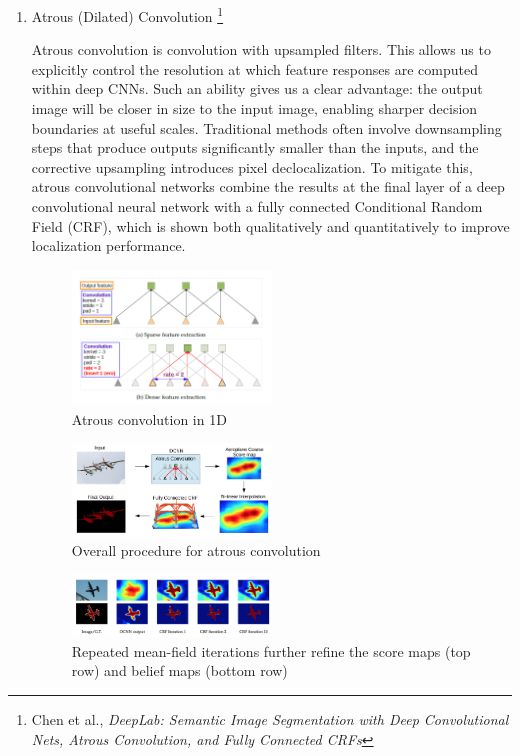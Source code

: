 \documentclass{article}
\begin{document}
\begin{enumerate}
\item Atrous (Dilated) Convolution \footnote{Chen et al., \textit{DeepLab: Semantic Image Segmentation with Deep Convolutional Nets, Atrous Convolution,
and Fully Connected CRFs}}

Atrous convolution is convolution with upsampled filters. This allows us to explicitly control the resolution at which feature responses are computed within deep CNNs. Such an ability gives us a clear advantage: the output image will be closer in size to the input image, enabling sharper decision boundaries at useful scales. Traditional methods often involve downsampling steps that produce outputs significantly smaller than the inputs, and the corrective upsampling introduces pixel declocalization. To mitigate this, atrous convolutional networks combine the results at the final layer of a deep convolutional neural network with a fully connected Conditional Random Field (CRF), which is shown both qualitatively and quantitatively to improve localization performance. 

\begin{figure}[h]
    \centering
    \includegraphics[width=0.5\textwidth]{21/deeplab.png}
    \caption{Atrous convolution in 1D}
    \label{fig:atrous}
\end{figure}


\begin{figure}[h]
    \centering
    \includegraphics[width=0.5\textwidth]{21/atrous_overview.png}
    \caption{Overall procedure for atrous convolution}
    \label{fig:atrous_sketch}
\end{figure}



\begin{figure}[h]
    \centering
    \includegraphics[width=0.5\textwidth]{21/crf_iter.png}
    \caption{Repeated mean-field iterations further refine the score maps (top row) and belief maps (bottom row)}
    \label{fig:atrous_iter}
\end{figure}



\end{enumerate}
\end{document}
